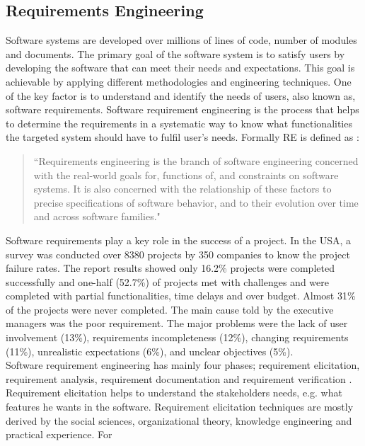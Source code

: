 \subsection{Requirements Engineering}

Software systems are developed over millions of lines of code, number of modules
and documents. The primary goal of the software system is to satisfy users by
developing the software that can meet their needs and expectations. This goal is
achievable by applying different methodologies and engineering techniques. One
of the key factor is to understand and identify the needs of users, also known
as, software requirements. Software requirement engineering is the process that
helps to determine the requirements in a systematic way to know what
functionalities the targeted system should have to fulfil user's needs. Formally
RE is defined as \cite{Zave:1997:CRE:267580.267581}:\\
\begin{quote}
``Requirements engineering is the branch of software engineering concerned with the real-world
goals for, functions of, and constraints on software systems. It is also concerned with the
relationship of these factors to precise specifications of software behavior, and to their evolution
over time and across software families."
\end{quote}
Software requirements play a key role in the success of a project. In the USA, a
survey was conducted over 8380 projects by 350 companies to know the project
failure rates. The report \cite{StandishReport} results showed only 16.2\% projects were
completed successfully and one-half (52.7\%) of projects met with challenges and
were completed with partial functionalities, time delays and over budget. Almost
31\% of the projects were never completed. The main cause told by the executive
managers was the poor requirement. The major problems were the lack of user
involvement (13\%), requirements incompleteness (12\%), changing requirements
(11\%), unrealistic expectations (6\%), and unclear objectives
(5\%). \\
Software requirement engineering has mainly four phases; requirement
elicitation, requirement analysis, requirement documentation and requirement
verification \cite {Kotonya:1998:REP:552009}. Requirement elicitation
\cite{Coughlan:2002:ECR:2740304.2740444,Zowghi2005} helps to understand the
stakeholders needs, e.g. what features he wants in the software.
Requirement elicitation techniques are mostly derived by the social sciences,
organizational theory, knowledge engineering and practical experience. For
